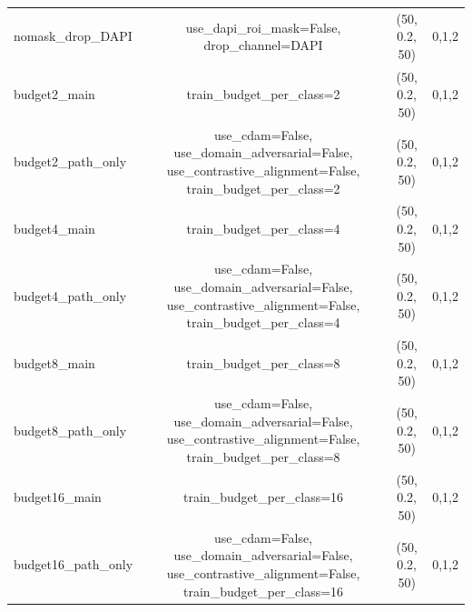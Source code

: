 \begin{table}[t]
{\begin{tabular}{@{}lccc@{}}
nomask\_drop\_DAPI & use\_dapi\_roi\_mask=False, drop\_channel=DAPI & (50, 0.2, 50) & 0,1,2 \\
budget2\_main & train\_budget\_per\_class=2 & (50, 0.2, 50) & 0,1,2 \\
budget2\_path\_only & use\_cdam=False, use\_domain\_adversarial=False, use\_contrastive\_alignment=False, train\_budget\_per\_class=2 & (50, 0.2, 50) & 0,1,2 \\
budget4\_main & train\_budget\_per\_class=4 & (50, 0.2, 50) & 0,1,2 \\
budget4\_path\_only & use\_cdam=False, use\_domain\_adversarial=False, use\_contrastive\_alignment=False, train\_budget\_per\_class=4 & (50, 0.2, 50) & 0,1,2 \\
budget8\_main & train\_budget\_per\_class=8 & (50, 0.2, 50) & 0,1,2 \\
budget8\_path\_only & use\_cdam=False, use\_domain\_adversarial=False, use\_contrastive\_alignment=False, train\_budget\_per\_class=8 & (50, 0.2, 50) & 0,1,2 \\
budget16\_main & train\_budget\_per\_class=16 & (50, 0.2, 50) & 0,1,2 \\
budget16\_path\_only & use\_cdam=False, use\_domain\_adversarial=False, use\_contrastive\_alignment=False, train\_budget\_per\_class=16 & (50, 0.2, 50) & 0,1,2 \\
\bottomrule
\end{tabular}%
}
\end{table}
